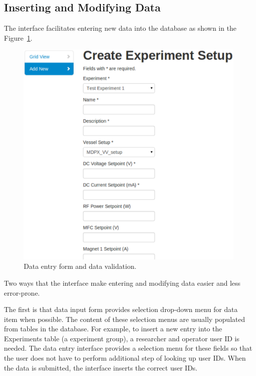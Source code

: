 \subsection{Inserting and Modifying Data}

The interface facilitates entering new data into the database as shown in the Figure~\ref{fig:create_exp_setup}.

\begin{figure}[h]
\centering
\includegraphics[width=6in]{create_experiment_setup.pdf}
\caption{Data entry form and data validation.\label{fig:create_exp_setup}}
\end{figure}

Two ways that the interface make entering and modifying data easier and less error-prone.

The first is that data input form provides selection drop-down menu for data item when possible. The content of these selection menus are usually populated from tables in the database. For example, to insert a new entry into the Experiments table (a experiment group), a researcher and operator user ID is needed. The data entry interface provides a selection menu for these fields so that the user does not have to perform additional step of looking up user IDs. When the data is submitted, the interface inserts the correct user IDs.

